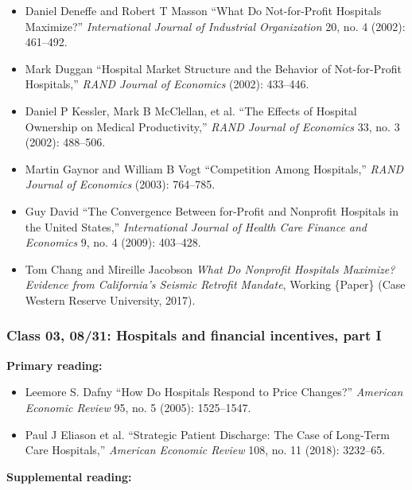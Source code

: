 \documentclass[11pt,]{article}
\providecommand{\tightlist}{%
  \setlength{\itemsep}{0pt}\setlength{\parskip}{0pt}}
\begin{document}
\begin{itemize}
\item
  Daniel Deneffe and Robert T Masson {``What Do Not-for-Profit Hospitals
  Maximize?''} \emph{International Journal of Industrial Organization}
  20, no. 4 (2002): 461--492.
\item
  Mark Duggan {``Hospital Market Structure and the Behavior of
  Not-for-Profit Hospitals,''} \emph{RAND Journal of Economics} (2002):
  433--446.
\item
  Daniel P Kessler, Mark B McClellan, et al. {``The {Effects} of
  {Hospital} {Ownership} on {Medical} {Productivity},''} \emph{RAND
  Journal of Economics} 33, no. 3 (2002): 488--506.
\item
  Martin Gaynor and William B Vogt {``Competition Among {Hospitals},''}
  \emph{RAND Journal of Economics} (2003): 764--785.
\item
  Guy David {``The Convergence Between for-Profit and Nonprofit
  Hospitals in the {United} {States},''} \emph{International Journal of
  Health Care Finance and Economics} 9, no. 4 (2009): 403--428.
\item
  Tom Chang and Mireille Jacobson \emph{What Do {Nonprofit} {Hospitals}
  {Maximize}? {Evidence} from {California}'s {Seismic} {Retrofit}
  {Mandate}}, Working \{Paper\} (Case Western Reserve University, 2017).
\end{itemize}

\hypertarget{class-03-0831-hospitals-and-financial-incentives-part-i}{%
\subsubsection{Class 03, 08/31: Hospitals and financial incentives, part
I}\label{class-03-0831-hospitals-and-financial-incentives-part-i}}

\textbf{Primary reading:}

\begin{itemize}
\tightlist
\item
  Leemore S. Dafny {``How {Do} {Hospitals} {Respond} to {Price}
  {Changes}?''} \emph{American Economic Review} 95, no. 5 (2005):
  1525--1547.
\item
  Paul J Eliason et al. {``Strategic Patient Discharge: {The} Case of
  Long-Term Care Hospitals,''} \emph{American Economic Review} 108, no.
  11 (2018): 3232--65.
\end{itemize}

\textbf{Supplemental reading:}
\end{document}
